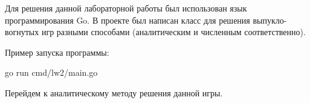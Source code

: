 
Для решения данной лабораторной работы был использован язык программирования Go.
В проекте был написан класс для решения выпукло-вогнутых игр разными способами
(аналитическим и численным соответственно).

Пример запуска программы:

\begin{codelisting}[language=Bash]
    go run cmd/lw2/main.go
\end{codelisting}

Перейдем к аналитическому методу решения данной игры.
